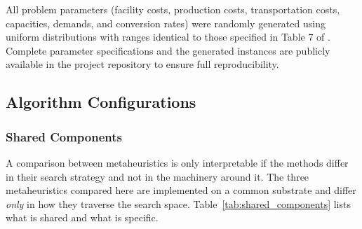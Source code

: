 \documentclass[preprint,12pt,authoryear]{elsarticle}
\begin{document}
All problem parameters (facility costs, production costs, transportation costs, capacities, demands, and conversion rates) were randomly generated using uniform distributions
with ranges identical to those specified in Table 7 of \cite{rajabi2023}. Complete parameter specifications and the generated instances are publicly available
in the project repository to ensure full reproducibility.


\subsection{Algorithm Configurations}
\label{subsec:configurations}

\subsubsection{Shared Components}
\label{subsubsec:shared}

A comparison between metaheuristics is only interpretable if the methods differ in their search strategy and not in
the machinery around it. The three metaheuristics compared here are implemented on a common substrate and differ
\emph{only} in how they traverse the search space. Table~\ref{tab:shared_components} lists what is shared and what
is specific.
\end{document}
